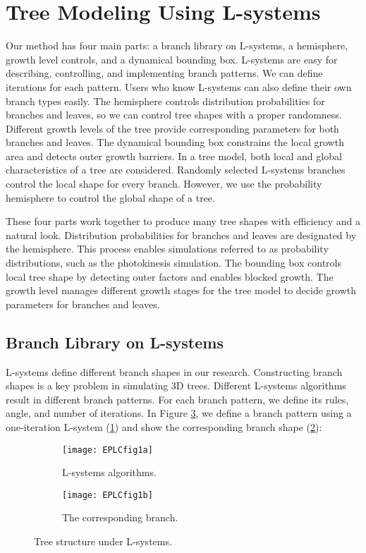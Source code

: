 \section{Tree Modeling Using L-systems} 

Our method has four main parts: a branch library on L-systems, a hemisphere, growth level controls, and a dynamical bounding box. L-systems are easy for describing, controlling, and implementing branch patterns. We can define iterations for each pattern. Users who know L-systems can also define their own branch types easily. The hemisphere controls distribution probabilities for branches and leaves, so we can control tree shapes with a proper randomness. Different growth levels of the tree provide corresponding parameters for both branches and leaves. The dynamical bounding box constrains the local growth area and detects outer growth barriers. 
In a tree model, both local and global characteristics of a tree are considered. Randomly selected L-systems branches control the local shape for every branch. However, we use the probability hemisphere to control the global shape of a tree. 

These four parts work together to produce many tree shapes with efficiency and a natural look. Distribution probabilities for branches and leaves are designated by the hemisphere. This process enables simulations referred to as probability distributions, such as the photokinesis simulation. The bounding box controls local tree shape by detecting outer factors and enables blocked growth. The growth level manages different growth stages for the tree model to decide growth parameters for branches and leaves.

\subsection{Branch Library on L-systems}

L-systems define different branch shapes in our research. Constructing branch shapes is a key problem in simulating 3D trees. Different L-systems algorithms result in different branch patterns. For each branch pattern, we define its rules, angle, and number of iterations. In Figure \ref{fig:eplc1}, we define a branch pattern using a one-iteration L-system (\ref{fig:sub1eplc1}) and show the corresponding branch shape (\ref{fig:sub2eplc1}):

\begin{figure}
\centering
        \begin{subfigure}[b]{0.4\textwidth}
                \centering
                \texttt{[image: EPLCfig1a]}
                \caption{L-systems algorithms.}
                \label{fig:sub1eplc1}
        \end{subfigure}
        \begin{subfigure}[b]{0.42\textwidth}
                \centering
                \texttt{[image: EPLCfig1b]}
                \caption{The corresponding branch.}
                \label{fig:sub2eplc1}
        \end{subfigure}   
        \caption{Tree structure under L-systems.}
        \label{fig:eplc1}
\end{figure}

